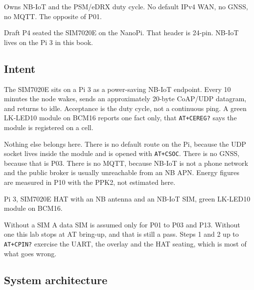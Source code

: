 
\begin{unique}
Owns NB-IoT and the PSM/eDRX duty cycle. No default IPv4 WAN, no GNSS, no MQTT. The opposite of P01.
\end{unique}

\begin{blueprint}
Draft P4 seated the SIM7020E on the NanoPi. That header is 24-pin. NB-IoT lives on the Pi 3 in this book.
\end{blueprint}

\subsection*{Intent}

The SIM7020E sits on a Pi 3 as a power-saving NB-IoT endpoint. Every 10 minutes the node wakes, sends an approximately 20-byte CoAP/UDP datagram, and returns to idle. Acceptance is the duty cycle, not a continuous ping. A green LK-LED10 module on BCM16 reports one fact only, that \texttt{AT+CEREG?} says the module is registered on a cell.

Nothing else belongs here. There is no default route on the Pi, because the UDP socket lives inside the module and is opened with \texttt{AT+CSOC}. There is no GNSS, because that is P03. There is no MQTT, because NB-IoT is not a phone network and the public broker is usually unreachable from an NB APN. Energy figures are measured in P10 with the PPK2, not estimated here.

\begin{kit}
Pi 3, SIM7020E HAT with an NB antenna and an NB-IoT SIM, green LK-LED10 module on BCM16.
\end{kit}

\begin{note}{Without a SIM}
A data SIM is assumed only for P01 to P03 and P13. Without one this lab stops at AT bring-up, and that is still a pass. Steps 1 and 2 up to \texttt{AT+CPIN?} exercise the UART, the overlay and the HAT seating, which is most of what goes wrong.
\end{note}

\subsection*{System architecture}


